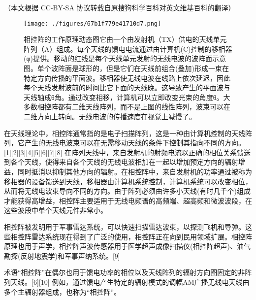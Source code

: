 
（本文根据 CC-BY-SA 协议转载自原搜狗科学百科对英文维基百科的翻译）

\begin{figure}[ht]
\centering
\texttt{[image: ./figures/67b1f779e41710d7.png]}
\caption{相控阵的工作原理动态图它由一个由发射机（TX）供电的天线单元阵列（A）组成。每个天线的馈电电流通过由计算机(C)控制的移相器(φ)提供。移动的红线是每个天线单元发射的无线电波的波阵面示意图。单个波阵面是球形的，但是它们在天线前组合(叠加)形成一束在特定方向传播的平面波。移相器使无线电波在线路上依次延迟，因此每个天线发射波前的时间比它下面的天线晚。这导致产生的平面波与天线轴成θ角。通过改变相移，计算机可以立即改变光束的角度θ。大多数相控阵都有二维天线阵列，而不是上图的线性阵列，波束可以在二维方向上转向。无线电波的传播速度在视觉上减慢了。} \label{fig_XKZ_1}
\end{figure}

在天线理论中，相控阵通常指的是电子扫描阵列，这是一种由计算机控制的天线阵列，它产生的无线电波束可以在无需移动天线的条件下控制其指向不同的方向。[1][2][3][4][5][6][7][8] 在阵列天线中，来自发射机的射频电流以正确的相位关系馈送到各个天线，使得来自各个天线的无线电波相加在一起以增加预定方向的辐射增益，同时抵消以抑制其他方向的辐射。在相控阵中，来自发射机的功率通过被称为移相器的设备馈送到天线，移相器由计算机系统控制，计算机系统可以改变相位，从而将无线电波束导向不同的方向。由于阵列必须由许多小天线(有时几千个)组成才能获得高增益，相控阵主要适用于无线电频谱的高频端、超高频和微波波段，在这些波段中单个天线元件非常小。

相控阵被发明用于军事雷达系统，可以快速扫描雷达波束，以探测飞机和导弹。这些相控阵雷达系统现在得到了广泛的使用，相控阵正在向到民用领域扩展。相控阵原理也用于声学，相控阵声波传感器用于医学超声成像扫描仪(相控阵超声)、油气勘探(反射地震学)和军事声纳系统。[9]

术语“相控阵”在偶尔也用于馈电功率的相位以及天线阵列的辐射方向图固定的非阵列天线。[6][10] 例如，通过馈电产生特定的辐射模式的调幅AM广播无线电天线由多个主辐射器组成，也称为“相控阵”。

\su